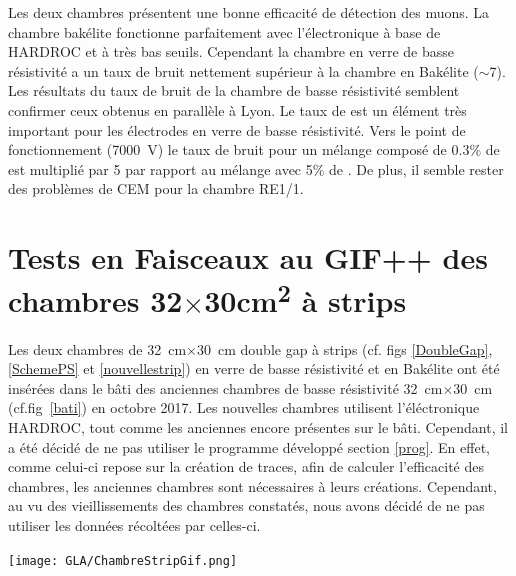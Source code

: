 Les deux chambres présentent une bonne efficacité de détection des muons. La chambre bakélite fonctionne parfaitement avec l'électronique à base de HARDROC et à très bas seuils. Cependant la chambre en verre de basse résistivité a un taux de bruit nettement supérieur à la chambre en Bakélite ($\sim$\num{7}). Les résultats du taux de bruit de la chambre de basse résistivité semblent confirmer ceux obtenus en parallèle à Lyon. Le taux de  est un élément très important pour les électrodes en verre de basse résistivité. Vers le point de fonctionnement (\SI{7000}{\volt}) le taux de bruit pour un mélange composé de \num{0.3}\% de  est multiplié par \num{5} par rapport au mélange avec \num{5}\% de . De plus, il semble rester des problèmes de CEM pour la chambre RE1/1.


\section{Tests en Faisceaux au GIF++ des chambres \texorpdfstring{\num{32}$\times$\num{30}\si{\square\centi\meter}}{30cm x 30cm} à strips}
\label{smallchamber}

Les deux chambres de \SI{32}{\centi\meter}$\times$\SI{30}{\centi\meter} double gap à strips (cf. figs \ref{DoubleGap}, \ref{SchemePS} et \ref{nouvellestrip}) en verre de basse résistivité et en Bakélite ont été insérées dans le bâti des anciennes chambres de basse résistivité \SI{32}{\centi\meter}$\times$\SI{30}{\centi\meter} (cf.fig~\ref{bati}) en octobre 2017. Les nouvelles chambres utilisent l'éléctronique HARDROC, tout comme les anciennes encore présentes sur le bâti. Cependant, il a été décidé de ne pas utiliser le programme développé section \ref{prog}. En effet, comme celui-ci repose sur la création de traces, afin de calculer l'efficacité des chambres, les anciennes chambres sont nécessaires à leurs créations. Cependant, au vu des vieillissements des chambres constatés, nous avons décidé de ne pas utiliser les données récoltées par celles-ci.

\marginpar
{
	\centering
	\texttt{[image: GLA/ChambreStripGif.png]}
	\label{nouvellestrip}
}

